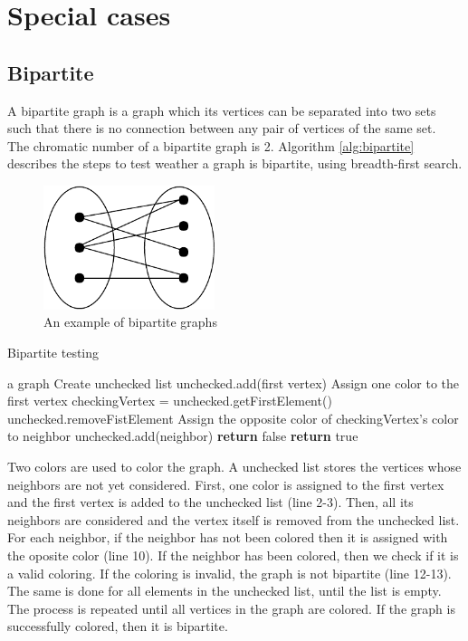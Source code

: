 \documentclass[a4paper]{report}
\begin{document}
		\section{Special cases}
			\subsection{Bipartite}
			A bipartite graph is a graph which its vertices can be separated into two sets such that there is no connection between any pair of vertices of the same set.\\
			The chromatic number of a bipartite graph is 2. Algorithm \ref{alg:bipartite} \cite{sedgewick2003} describes the steps to test weather a graph is bipartite, using breadth-first search. \\
			
			\begin{figure}[h]
				\centering
				\includegraphics[width=50mm,scale=0.5]{figures/bipartite.pdf}
				\caption{An example of bipartite graphs}
				\label{fig:bipartite}
			\end{figure}
			
			\begin{algorithm}
				\caption{Bipartite testing}
				\label{alg:bipartite}
			
				\begin{algorithmic}[1]
					\REQUIRE a graph
					\STATE Create unchecked list
					\STATE unchecked.add(first vertex)
					\STATE Assign one color to the first vertex
					\STATE checkingVertex = unchecked.getFirstElement()
					\STATE unchecked.removeFistElement
					\STATE Assign the opposite color of checkingVertex's color to neighbor
					\STATE unchecked.add(neighbor)
					\STATE \textbf{return} false
					\ENDIF
					\ENDFOR
					\ENDWHILE
					\ENDWHILE
					\STATE \textbf{return} true
				\end{algorithmic}
			\end{algorithm}
			 Two colors are used to color the graph. A unchecked list stores the vertices whose neighbors are not yet considered. First, one color is assigned to the first vertex and the first vertex is added to the unchecked list (line 2-3). Then, all its neighbors are considered and the vertex itself is removed from the unchecked list. For each neighbor, if the neighbor has not been colored then it is assigned with the oposite color (line 10). If the neighbor has been colored, then we check if it is a valid coloring. If the coloring is invalid, the graph is not bipartite (line 12-13). The same is done for all elements in the unchecked list, until the list is empty. The process is repeated until all vertices in the graph are colored. If the graph is successfully colored, then it is bipartite.
\end{document}
